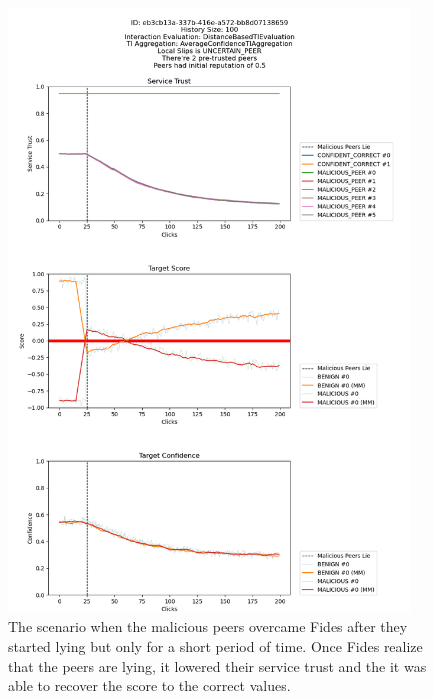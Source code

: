 \begin{figure}
    \centering
    \includegraphics[width=0.95\textwidth]{assets/miss_classification_recovery.png}
    \caption{The scenario when the malicious peers overcame Fides after they started lying but only for a short period of time. Once Fides realize that the peers are lying, it lowered their service trust and the it was able to recover the score to the correct values.}
    \label{fig:missclassification-recovery}
\end{figure}

